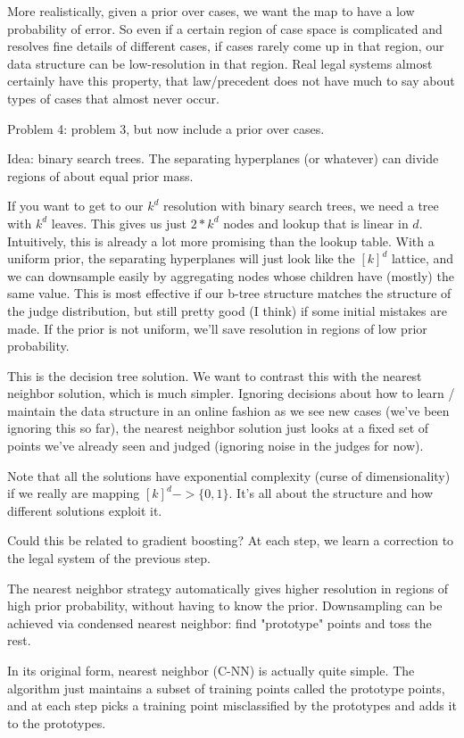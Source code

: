 \documentclass{article}
\begin{document}
More realistically, given a prior over cases, we want the map to have a low probability of error. So even if a certain region of case space is complicated and resolves fine details of different cases, if cases rarely come up in that region, our data structure can be low-resolution in that region. Real legal systems almost certainly have this property, that law/precedent does not have much to say about types of cases that almost never occur. 

Problem 4: problem 3, but now include a prior over cases.

Idea: binary search trees. The separating hyperplanes (or whatever) can divide regions of about equal prior mass.

If you want to get to our $k^d$ resolution with binary search trees, we need a tree with $k^d$ leaves. This gives us just $2 * k^d$ nodes and lookup that is linear in $d$. Intuitively, this is already a lot more promising than the lookup table. With a uniform prior, the separating hyperplanes will just look like the $[k]^d$ lattice, and we can downsample easily by aggregating nodes whose children have (mostly) the same value. This is most effective if our b-tree structure matches the structure of the judge distribution, but still pretty good (I think) if some initial mistakes are made. If the prior is not uniform, we'll save resolution in regions of low prior probability.

This is the decision tree solution. We want to contrast this with the nearest neighbor solution, which is much simpler. Ignoring decisions about how to learn / maintain the data structure in an online fashion as we see new cases (we've been ignoring this so far), the nearest neighbor solution just looks at a fixed set of points we've already seen and judged (ignoring noise in the judges for now). 

Note that all the solutions have exponential complexity (curse of dimensionality) if we really are mapping $[k]^d -> \{0, 1\}$. It's all about the structure and how different solutions exploit it.

Could this be related to gradient boosting? At each step, we learn a correction to the legal system of the previous step.

The nearest neighbor strategy automatically gives higher resolution in regions of high prior probability, without having to know the prior. Downsampling can be achieved via condensed nearest neighbor: find "prototype" points and toss the rest. 

In its original form, nearest neighbor (C-NN) is actually quite simple. The algorithm just maintains a subset of training points called the prototype points, and at each step picks a training point misclassified by the prototypes and adds it to the prototypes. 
\end{document}
